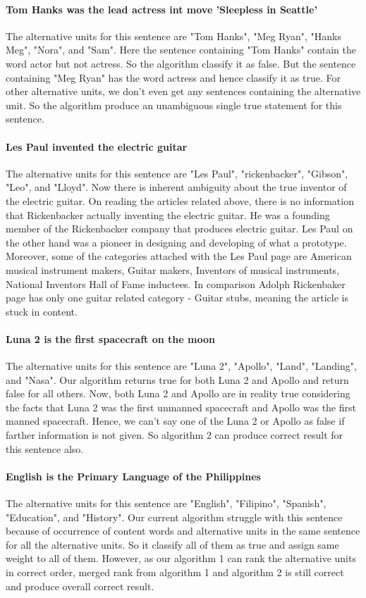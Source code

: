 \documentclass[11pt]{article}
\begin{document}
\paragraph{Tom Hanks was the lead actress  int move 'Sleepless in Seattle'}
The alternative units for this sentence are "Tom Hanks", "Meg Ryan", "Hanks Meg", "Nora", and "Sam". Here the sentence containing "Tom Hanks" contain the word actor but not actress. So the algorithm classify it as false. But the sentence containing "Meg Ryan" has the word actress and hence classify it as true. For other alternative units, we don't even get any sentences containing the alternative unit. So the algorithm produce an unambiguous single true statement for this sentence.

\paragraph{Les Paul invented the electric guitar}
The alternative units for this sentence are "Les Paul", "rickenbacker", "Gibson", "Leo", and "Lloyd". Now there is inherent ambiguity about the true inventor of the electric guitar. On reading the articles related above, there is no information that Rickenbacker actually inventing the electric guitar. He was a founding member of the Rickenbacker company that produces electric guitar. Les Paul on the other hand was a pioneer in designing and developing of what a prototype. Moreover, some of the categories attached with the Les Paul page are American musical instrument makers, Guitar makers, Inventors of musical instruments, National Inventors Hall of Fame inductees. In comparison Adolph Rickenbaker page has only one guitar related category - Guitar stubs, meaning the article is stuck in content.

\paragraph{Luna 2 is the first spacecraft on the moon}
The alternative units for this sentence are "Luna 2", "Apollo", "Land", "Landing", and "Nasa". Our algorithm returns true for both Luna 2 and Apollo and return false for all others. Now, both Luna 2 and Apollo are in reality true considering the facts that Luna 2 was the first unmanned spacecraft and Apollo was the first manned spacecraft. Hence, we can't say one of the Luna 2 or Apollo as false if farther information is not given. So algorithm 2 can produce correct result for this sentence also.

\paragraph{English is the Primary Language of the Philippines}
The alternative units for this sentence are "English", "Filipino", "Spanish", "Education", and "History". Our current algorithm struggle with this sentence because of occurrence of content words and alternative units in the same sentence for all the alternative units. So it classify all of them as true and assign same weight to all of them. However, as our algorithm 1 can rank the alternative units in correct order, merged rank from algorithm 1 and algorithm 2 is still correct and produce overall correct result. 
\end{document}

